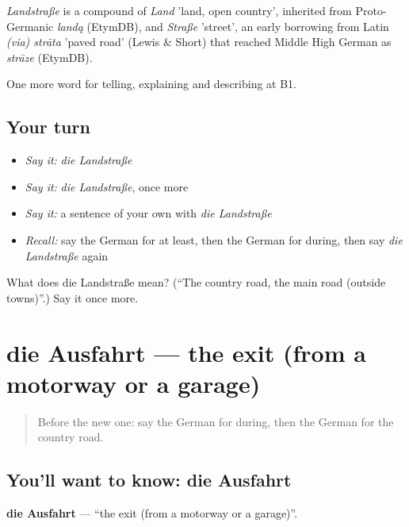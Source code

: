\begin{cousinweb}
\emph{Landstraße} is a compound of \emph{Land} 'land, open country', inherited from Proto-Germanic \emph{landą} (EtymDB), and \emph{Straße} 'street', an early borrowing from Latin \emph{(via) strāta} 'paved road' (Lewis \& Short) that reached Middle High German as \emph{strāze} (EtymDB).
\end{cousinweb}

\begin{grammarlens}[title={What you've built}]
One more word for telling, explaining and describing at B1.
\end{grammarlens}

\subsection*{Your turn}
\begin{itemize}
\raggedright
  \item \emph{Say it:} \emph{die Landstraße}
  \item \emph{Say it:} \emph{die Landstraße}, once more
  \item \emph{Say it:} a sentence of your own with \emph{die Landstraße}
  \item \emph{Recall:} say the German for at least, then the German for during, then say \emph{die Landstraße} again
\end{itemize}

\begin{tcolorbox}[breakable,colback=teal!4,colframe=teal!35!black,title={Before you move on}]
What does die Landstraße mean? (\textquotedblleft{}The country road, the main road (outside towns)\textquotedblright{}.) Say it once more.
\end{tcolorbox}
\section[die Ausfahrt]{die Ausfahrt — the exit (from a motorway or a garage)}

\label{lesson:GE-C398-ausfahrt}



\begin{quote}
Before the new one: say the German for during, then the German for the country road.
\end{quote}

\subsection*{You'll want to know: die Ausfahrt}
\textbf{die Ausfahrt} — \textquotedblleft{}the exit (from a motorway or a garage)\textquotedblright{}.

